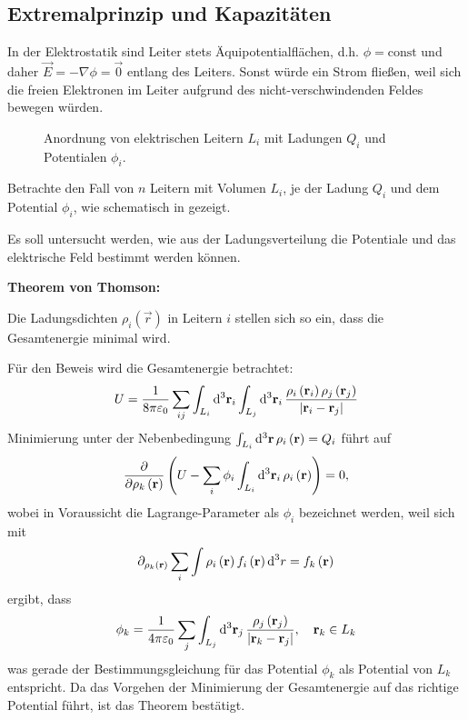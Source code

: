 \subsection{Extremalprinzip und Kapazitäten}

\begin{formal}
	In der Elektrostatik sind Leiter stets Äquipotentialflächen, d.h. $\phi =\text{const}$ und daher $\vec {E}=-\nabla \phi =\vec {0}$ entlang des Leiters. Sonst würde ein Strom fließen, weil sich die freien Elektronen im Leiter aufgrund des nicht-verschwindenden Feldes bewegen würden.
\end{formal}

\begin{figure}[htb]
	\centering
	\tfigThreeConductors
	\caption{Anordnung von elektrischen Leitern $L_i$ mit Ladungen $Q_i$ und Potentialen $\phi_i$. }
	\label{fig:three_conductors}
\end{figure}

Betrachte den Fall von $n$ Leitern mit Volumen $L_{i}$, je der Ladung $Q_{i}$ und dem Potential $\phi _{i}$, wie schematisch in  gezeigt.

Es soll untersucht werden, wie aus der Ladungsverteilung die Potentiale und das elektrische Feld bestimmt werden können.
\begin{formal}
	\textbf{Theorem von Thomson:}

	Die Ladungsdichten $\rho _{i}\left(\vec {r}\right)$ in Leitern $i$ stellen sich so ein, dass die Gesamtenergie minimal wird.
\end{formal}
Für den Beweis wird die Gesamtenergie betrachtet:
\begin{equation*}
	U=\frac{1}{8\pi \varepsilon _{0}}\sum _{ij}\int _{L_{i}}\diffa[3]{\vec {r}_{i}}\int _{L_{j}}\diffa[3]{\vec {r}_{i}}\frac{\rho _{i}\left(\vec {r}_{i}\right)\rho _{j}\left(\vec {r}_{j}\right)}{\left| \vec {r}_{i}-\vec {r}_{j}\right| }
\end{equation*}
Minimierung unter der Nebenbedingung $\int _{{L_{i}}}\diffa[3]{\vec {r}}\rho _{i}\left(\vec {r}\right)=Q_{i}$ führt auf
\begin{equation*}
	\frac{\partial }{\partial \rho _{k}\left(\vec {r}\right)}\left(U-\sum _{i}\phi _{i}\int _{L_{i}}\diffa[3]{\vec {r}_{i}}\rho _{i}\left(\vec {r}\right)\right)=0,
\end{equation*}
wobei in Voraussicht die Lagrange-Parameter als $\phi _{i}$ bezeichnet werden, weil sich mit
\begin{equation*}
	\partial _{{\rho _{k}}\left(\vec {r}\right)}\sum _{i}\int \rho _{i}\left(\vec {r}\right)f_{i}\left(\vec {r}\right)\diff ^{3}r=f_{k}\left(\vec {r}\right)
\end{equation*}
ergibt, dass
\begin{equation*}
	\phi _{k}=\frac{1}{4\pi \varepsilon _{0}}\sum _{j}\int _{L_{j}}\diffa[3]{\vec {r}_{j}}\frac{\rho _{j}\left(\vec {r}_{j}\right)}{\left| \vec {r}_{k}-\vec {r}_{j}\right| },\quad \vec {r}_{k}\in L_{k}
\end{equation*}
was gerade der Bestimmungsgleichung für das Potential $\phi _{k}$ als Potential von $L_{k}$ entspricht. Da das Vorgehen der Minimierung der Gesamtenergie auf das richtige Potential führt, ist das Theorem bestätigt.



